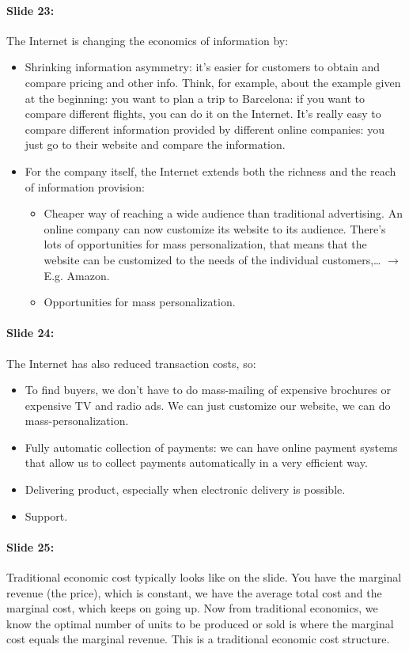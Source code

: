 \documentclass[10pt,a4paper]{report}
\begin{document}
\paragraph{Slide 23:}The Internet is changing the economics of information by:
\begin{itemize}
\item Shrinking information asymmetry: it's easier for customers to obtain and compare pricing and other info. Think, for example, about the example given at the beginning: you want to plan a trip to Barcelona: if you want to compare different flights, you can do it on the Internet. It's really easy to compare different information provided by different online companies: you just go to their website and compare the information.
\item For the company itself, the Internet extends both the richness and the reach of information provision:
\begin{itemize}
\item Cheaper way of reaching a wide audience than traditional advertising. An online company can now customize its website to its audience. There's lots of opportunities for mass personalization, that means that the website can be customized to the needs of the individual customers,… $\rightarrow$ E.g. Amazon.
\item Opportunities for mass personalization.
\end{itemize}
\end{itemize}

\paragraph{Slide 24:}The Internet has also reduced transaction costs, so:
\begin{itemize}
\item To find buyers, we don't have to do mass-mailing of expensive brochures or expensive TV and radio ads. We can just customize our website, we can do mass-personalization.
\item Fully automatic collection of payments: we can have online payment systems that allow us to collect payments automatically in a very efficient way.
\item Delivering product, especially when electronic delivery is possible.
\item Support.
\end{itemize}

\paragraph{Slide 25:}Traditional economic cost typically looks like on the slide. You have the marginal revenue (the price), which is constant, we have the average total cost and the marginal cost, which keeps on going up. Now from traditional economics, we know the optimal number of units to be produced or sold is where the marginal cost equals the marginal revenue. This is a traditional economic cost structure.
\end{document}
